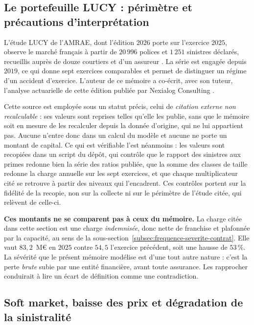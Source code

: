 \subsection{Le portefeuille LUCY : périmètre et précautions d'interprétation}
\label{subsec:lucy-perimetre}

L'étude LUCY de l'AMRAE, dont l'édition $2026$ porte sur l'exercice $2025$, observe le marché
français à partir de $20\,996$ polices et $1\,251$ sinistres déclarés, recueillis auprès de douze
courtiers et d'un assureur \citep{amraeLucy2026}. La série est engagée depuis $2019$, ce qui donne
sept exercices comparables et permet de distinguer un régime d'un accident d'exercice. L'auteur de
ce mémoire a co-écrit, avec son tuteur, l'analyse actuarielle de cette édition publiée par
Nexialog Consulting \citep{RapiorKaddouri2026}.

Cette source est employée sous un statut précis, celui de \emph{citation externe non
recalculable} : ses valeurs sont reprises telles qu'elle les publie, sans que le mémoire soit en
mesure de les recalculer depuis la donnée d'origine, qui ne lui appartient pas. Aucune n'entre
donc dans un calcul du modèle et aucune ne porte un montant de capital. Ce qui est vérifiable
l'est néanmoins : les valeurs sont recopiées dans un script du dépôt, qui contrôle que le rapport
des sinistres aux primes redonne bien la série des ratios publiée, que la somme des classes de
taille redonne la charge annuelle sur les sept exercices, et que chaque multiplicateur cité se
retrouve à partir des niveaux qui l'encadrent. Ces contrôles portent sur la fidélité de la
recopie, non sur la collecte ni sur le périmètre de l'étude citée, qui relèvent de celle-ci.

\begin{attention}
\textbf{Ces montants ne se comparent pas à ceux du mémoire.} La charge citée dans cette section
est une charge \emph{indemnisée}, donc nette de franchise et plafonnée par la capacité, au sens
de la sous-section~\ref{subsec:frequence-severite-contrat}. Elle vaut $83{,}2$~M\euro{} en $2025$
contre $54{,}5$ l'exercice précédent, soit une hausse de $53\,\%$. La sévérité que le présent
mémoire modélise est d'une tout autre nature : c'est la perte \emph{brute} subie par une entité
financière, avant toute assurance. Les rapprocher conduirait à lire un écart de définition comme
une contradiction.
\end{attention}

\subsection{Soft market, baisse des prix et dégradation de la sinistralité}
\label{subsec:lucy-soft-market}

